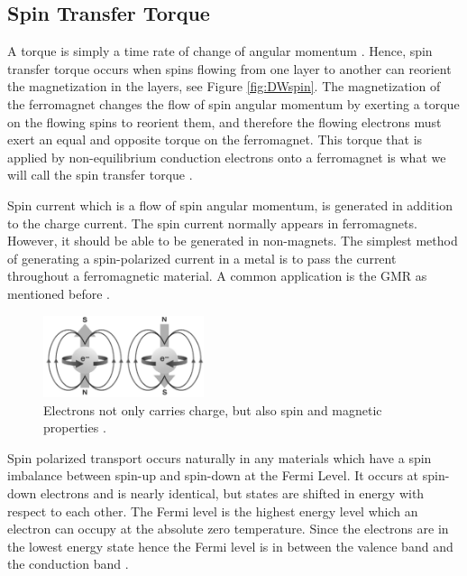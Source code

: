 \subsection{Spin Transfer Torque }

A torque is simply a time rate of change of angular momentum \cite{spintransfer}. Hence, spin transfer torque occurs when spins flowing from one layer to another can reorient the magnetization in the layers, see Figure \ref{fig:DWspin}. The magnetization of the ferromagnet changes the flow of spin angular momentum by exerting a torque on the flowing spins to reorient them, and therefore the flowing electrons must exert an equal and opposite torque on the ferromagnet. This torque that is applied by non-equilibrium conduction electrons onto a ferromagnet is what we will call the spin transfer torque \cite{spintransfer}.

Spin current which is a flow of spin angular momentum, is generated in addition to the charge current. The spin current normally appears in ferromagnets. However, it should be able to be generated in non-magnets. The simplest method of generating a spin-polarized current in a metal is to pass the current throughout a ferromagnetic material. A common application is the GMR as mentioned before \cite{handbookspin}.

\begin{figure}[htbp]
	\centering
		\includegraphics[width=0.42\textwidth]{Figures/electron.png}
		\smallskip
	\caption[Electron carries spin, charge and magnetic]{Electrons not only carries charge, but also spin and magnetic properties \cite{spinimg}. }
	\label{fig:electron}
\end{figure}


Spin polarized transport occurs naturally in any materials which have a spin imbalance between spin-up and spin-down at the Fermi Level. It occurs at spin-down electrons and is nearly identical, but states are shifted in energy with respect to each other. The Fermi level is the highest energy level which an electron can occupy at the absolute zero temperature. Since the electrons are in the lowest energy state hence the Fermi level is in between the valence band and the conduction band \cite{handbookspin}.

